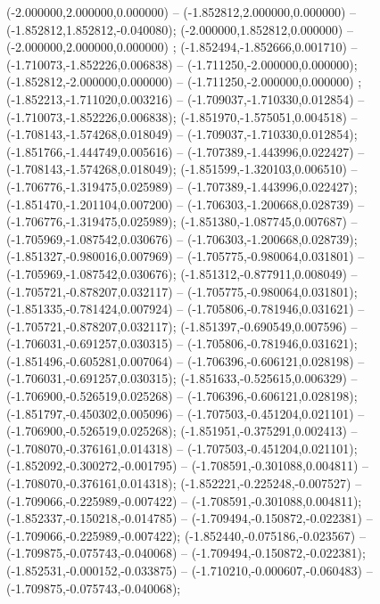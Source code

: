  (-2.000000,2.000000,0.000000) -- (-1.852812,2.000000,0.000000) -- (-1.852812,1.852812,-0.040080);
 (-2.000000,1.852812,0.000000) -- (-2.000000,2.000000,0.000000) ;
 (-1.852494,-1.852666,0.001710) -- (-1.710073,-1.852226,0.006838) -- (-1.711250,-2.000000,0.000000);
 (-1.852812,-2.000000,0.000000) -- (-1.711250,-2.000000,0.000000) ;
 (-1.852213,-1.711020,0.003216) -- (-1.709037,-1.710330,0.012854) -- (-1.710073,-1.852226,0.006838);
 (-1.851970,-1.575051,0.004518) -- (-1.708143,-1.574268,0.018049) -- (-1.709037,-1.710330,0.012854);
 (-1.851766,-1.444749,0.005616) -- (-1.707389,-1.443996,0.022427) -- (-1.708143,-1.574268,0.018049);
 (-1.851599,-1.320103,0.006510) -- (-1.706776,-1.319475,0.025989) -- (-1.707389,-1.443996,0.022427);
 (-1.851470,-1.201104,0.007200) -- (-1.706303,-1.200668,0.028739) -- (-1.706776,-1.319475,0.025989);
 (-1.851380,-1.087745,0.007687) -- (-1.705969,-1.087542,0.030676) -- (-1.706303,-1.200668,0.028739);
 (-1.851327,-0.980016,0.007969) -- (-1.705775,-0.980064,0.031801) -- (-1.705969,-1.087542,0.030676);
 (-1.851312,-0.877911,0.008049) -- (-1.705721,-0.878207,0.032117) -- (-1.705775,-0.980064,0.031801);
 (-1.851335,-0.781424,0.007924) -- (-1.705806,-0.781946,0.031621) -- (-1.705721,-0.878207,0.032117);
 (-1.851397,-0.690549,0.007596) -- (-1.706031,-0.691257,0.030315) -- (-1.705806,-0.781946,0.031621);
 (-1.851496,-0.605281,0.007064) -- (-1.706396,-0.606121,0.028198) -- (-1.706031,-0.691257,0.030315);
 (-1.851633,-0.525615,0.006329) -- (-1.706900,-0.526519,0.025268) -- (-1.706396,-0.606121,0.028198);
 (-1.851797,-0.450302,0.005096) -- (-1.707503,-0.451204,0.021101) -- (-1.706900,-0.526519,0.025268);
 (-1.851951,-0.375291,0.002413) -- (-1.708070,-0.376161,0.014318) -- (-1.707503,-0.451204,0.021101);
 (-1.852092,-0.300272,-0.001795) -- (-1.708591,-0.301088,0.004811) -- (-1.708070,-0.376161,0.014318);
 (-1.852221,-0.225248,-0.007527) -- (-1.709066,-0.225989,-0.007422) -- (-1.708591,-0.301088,0.004811);
 (-1.852337,-0.150218,-0.014785) -- (-1.709494,-0.150872,-0.022381) -- (-1.709066,-0.225989,-0.007422);
 (-1.852440,-0.075186,-0.023567) -- (-1.709875,-0.075743,-0.040068) -- (-1.709494,-0.150872,-0.022381);
 (-1.852531,-0.000152,-0.033875) -- (-1.710210,-0.000607,-0.060483) -- (-1.709875,-0.075743,-0.040068);
